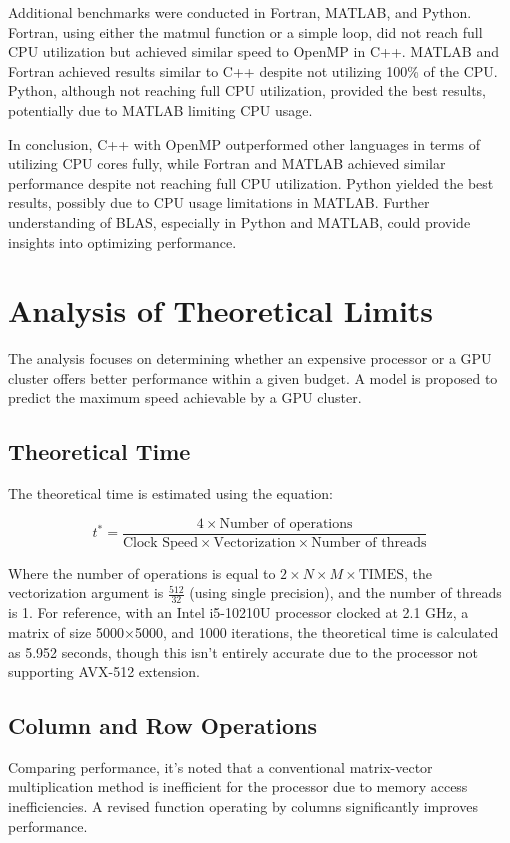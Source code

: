 \documentclass{article}
\begin{document}
Additional benchmarks were conducted in Fortran, MATLAB, and Python. Fortran, using either the matmul function or a simple loop, did not reach full CPU utilization but achieved similar speed to OpenMP in C++. MATLAB and Fortran achieved results similar to C++ despite not utilizing 100\% of the CPU. Python, although not reaching full CPU utilization, provided the best results, potentially due to MATLAB limiting CPU usage.

In conclusion, C++ with OpenMP outperformed other languages in terms of utilizing CPU cores fully, while Fortran and MATLAB achieved similar performance despite not reaching full CPU utilization. Python yielded the best results, possibly due to CPU usage limitations in MATLAB. Further understanding of BLAS, especially in Python and MATLAB, could provide insights into optimizing performance.
\section*{Analysis of Theoretical Limits}
The analysis focuses on determining whether an expensive processor or a GPU cluster offers better performance within a given budget. A model is proposed to predict the maximum speed achievable by a GPU cluster.

    \subsection*{Theoretical Time}
        The theoretical time is estimated using the equation:

        \[ t^* = \frac{4 \times \text{Number of operations}}{\text{Clock Speed} \times \text{Vectorization} \times \text{Number of threads}} \]

        Where the number of operations is equal to \( 2 \times N \times M \times \text{TIMES} \), the vectorization argument is \( \frac{512}{32} \) (using single precision), and the number of threads is 1.  For reference, with an Intel i5-10210U processor clocked at 2.1 GHz, a matrix of size 5000×5000, and 1000 iterations, the theoretical time is calculated as 5.952 seconds, though this isn't entirely accurate due to the processor not supporting AVX-512 extension.

    \subsection*{Column and Row Operations}
        Comparing performance, it's noted that a conventional matrix-vector multiplication method is inefficient for the processor due to memory access inefficiencies. A revised function operating by columns significantly improves performance.
\end{document}
